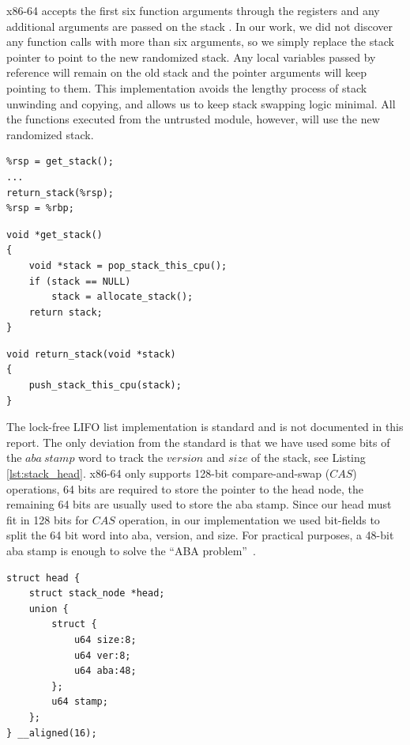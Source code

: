 x86-64 accepts the first six function arguments through the registers and any additional arguments are passed on the stack \cite{X86_ABI}. In our work, we did not discover any function calls with more than six arguments, so we simply replace the stack pointer to point to the new randomized stack. Any local variables passed by reference will remain on the old stack and the pointer arguments will keep pointing to them. This implementation avoids the lengthy process of stack unwinding and copying, and allows us to keep stack swapping logic minimal. All the functions executed from the untrusted module, however, will use the new randomized stack.

\lstset{language=C}
\begin{lstlisting}[frame=single, caption={Stack Randomization},label={lst:stack_randomization}]
%rbp = %rsp;
%rsp = get_stack();
...
return_stack(%rsp);
%rsp = %rbp;
\end{lstlisting}

\lstset{language=C}
\begin{lstlisting}[frame=single, caption={get\_stack()},label={lst:get_stack}]
void *get_stack()
{
    void *stack = pop_stack_this_cpu();
    if (stack == NULL)
        stack = allocate_stack();
    return stack;
}
\end{lstlisting}

\lstset{language=C}
\begin{lstlisting}[frame=single, caption={return\_stack()},label={lst:return_stack}]
void return_stack(void *stack)
{
    push_stack_this_cpu(stack);
}
\end{lstlisting}

The lock-free LIFO list implementation is standard and is not documented in this report. The only deviation from the standard is that we have used some bits of the $aba\ stamp$ word to track the $version$ and $size$ of the stack, see Listing \ref{lst:stack_head}. x86-64 only supports 128-bit compare-and-swap ($CAS$) operations, 64 bits are required to store the pointer to the head node, the remaining 64 bits are usually used to store the aba stamp. Since our head must fit in 128 bits for $CAS$ operation, in our implementation we used bit-fields to split the 64 bit word into aba, version, and size. For practical purposes, a 48-bit aba stamp is enough to solve the ``ABA problem''~\cite{CAS_Reactor}.

\lstset{language=C}
\begin{lstlisting}[frame=single, caption={Head Structure},label={lst:stack_head}]
struct head {
	struct stack_node *head;
	union {
		struct {
			u64 size:8;
			u64 ver:8;
			u64 aba:48;
		};
		u64 stamp;
	};
} __aligned(16);
\end{lstlisting}

